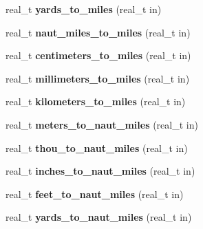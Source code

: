 \begin{DoxyCompactItemize}
\item 
\hypertarget{namespaceetk_a2813e26e0e9944cccd3139ebab64fb93}{real\-\_\-t {\bfseries yards\-\_\-to\-\_\-miles} (real\-\_\-t in)}\label{namespaceetk_a2813e26e0e9944cccd3139ebab64fb93}

\item 
\hypertarget{namespaceetk_a6ba80c1dec0e2371093f13a53d3d08aa}{real\-\_\-t {\bfseries naut\-\_\-miles\-\_\-to\-\_\-miles} (real\-\_\-t in)}\label{namespaceetk_a6ba80c1dec0e2371093f13a53d3d08aa}

\item 
\hypertarget{namespaceetk_a4e732ac35f4b69c50816e913cf052b47}{real\-\_\-t {\bfseries centimeters\-\_\-to\-\_\-miles} (real\-\_\-t in)}\label{namespaceetk_a4e732ac35f4b69c50816e913cf052b47}

\item 
\hypertarget{namespaceetk_af2bd2cc77399bb90f202f11d7fc5fe0d}{real\-\_\-t {\bfseries millimeters\-\_\-to\-\_\-miles} (real\-\_\-t in)}\label{namespaceetk_af2bd2cc77399bb90f202f11d7fc5fe0d}

\item 
\hypertarget{namespaceetk_a385b323cb7978412a55a0a8f493628eb}{real\-\_\-t {\bfseries kilometers\-\_\-to\-\_\-miles} (real\-\_\-t in)}\label{namespaceetk_a385b323cb7978412a55a0a8f493628eb}

\item 
\hypertarget{namespaceetk_a2c280eb40fe227a77688a68e0d08713b}{real\-\_\-t {\bfseries meters\-\_\-to\-\_\-naut\-\_\-miles} (real\-\_\-t in)}\label{namespaceetk_a2c280eb40fe227a77688a68e0d08713b}

\item 
\hypertarget{namespaceetk_acca63219f0aefee35c31dddd5ada86ca}{real\-\_\-t {\bfseries thou\-\_\-to\-\_\-naut\-\_\-miles} (real\-\_\-t in)}\label{namespaceetk_acca63219f0aefee35c31dddd5ada86ca}

\item 
\hypertarget{namespaceetk_a87644071ea04b27866fa85ae1c7946cc}{real\-\_\-t {\bfseries inches\-\_\-to\-\_\-naut\-\_\-miles} (real\-\_\-t in)}\label{namespaceetk_a87644071ea04b27866fa85ae1c7946cc}

\item 
\hypertarget{namespaceetk_a195e47c2a00c5f165a392717d293e88d}{real\-\_\-t {\bfseries feet\-\_\-to\-\_\-naut\-\_\-miles} (real\-\_\-t in)}\label{namespaceetk_a195e47c2a00c5f165a392717d293e88d}

\item 
\hypertarget{namespaceetk_ad421b10d2b2c0c523d57b6e8570e635e}{real\-\_\-t {\bfseries yards\-\_\-to\-\_\-naut\-\_\-miles} (real\-\_\-t in)}\label{namespaceetk_ad421b10d2b2c0c523d57b6e8570e635e}


\end{DoxyCompactItemize}
